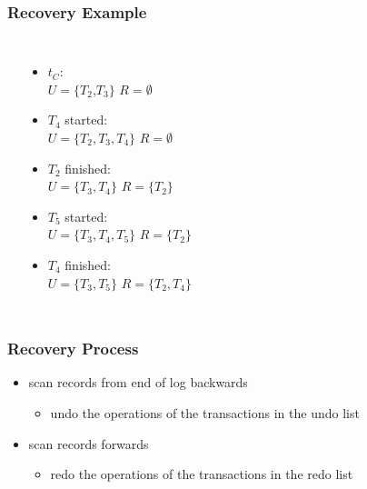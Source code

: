 \documentclass[dvipsnames]{beamer}
\theoremstyle{plain}
\begin{document}
\begin{frame}
  \frametitle{Recovery Example}

  \begin{example}
    \begin{columns}[t]
      \begin{center}
      \end{center}

      \pause
      \begin{itemize}
        \item $t_C$:\\
          $U=\{T_2$,$T_3\}$
          $R=\emptyset$

        \pause
        \item $T_4$ started:\\
          $U=\{T_2,T_3,T_4\}$
          $R=\emptyset$

        \pause
        \item $T_2$ finished:\\
          $U=\{T_3,T_4\}$
          $R=\{T_2\}$

        \pause
        \item $T_5$ started:\\
          $U=\{T_3,T_4,T_5\}$
          $R=\{T_2\}$

        \pause
        \item $T_4$ finished:\\
          $U=\{T_3,T_5\}$
          $R=\{T_2,T_4\}$
      \end{itemize}
    \end{columns}
  \end{example}
\end{frame}

\begin{frame}
  \frametitle{Recovery Process}

  \begin{itemize}
    \item scan records from end of log backwards
    \begin{itemize}
      \item undo the operations of the transactions in the undo list
    \end{itemize}

    \pause
    \item scan records forwards
    \begin{itemize}
      \item redo the operations of the transactions in the redo list
    \end{itemize}
  \end{itemize}
\end{frame}
\end{document}
